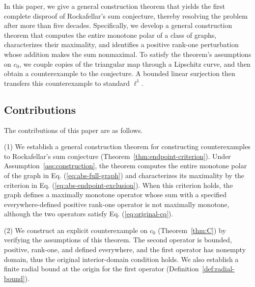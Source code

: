 \documentclass[11pt]{article}
\theoremstyle{definition}
\theoremstyle{remark}
\begin{document}

In this paper, we give a general construction theorem that yields the first complete disproof of Rockafellar's sum conjecture, thereby resolving the problem after more than five decades. 
Specifically, we develop a general construction theorem that computes the entire monotone polar of a class of graphs, characterizes their maximality, and identifies a positive rank-one perturbation whose addition makes the sum nonmaximal. To satisfy the theorem's assumptions on $c_0$, we couple copies of the triangular map through a Lipschitz curve, and then obtain a counterexample to the conjecture. A bounded linear surjection then transfers this counterexample to standard $\ell^1$. 

\subsection{Contributions}
The contributions of this paper are as follows. 

(1) We establish a general construction theorem for constructing counterexamples to Rockafellar's sum conjecture (Theorem~\ref{thm:endpoint-criterion}). Under Assumption~\ref{ass:construction}, the theorem computes the entire monotone polar of the graph in Eq. (\ref{eq:abs-full-graph}) and characterizes its maximality by the criterion in Eq. (\ref{eq:abs-endpoint-exclusion}). When this criterion holds, the graph defines a maximally monotone operator whose sum with a specified everywhere-defined positive rank-one operator is not maximally monotone, although the two operators satisfy Eq. (\ref{eq:original-cq}).

(2) We construct an explicit counterexample on $c_0$ (Theorem~\ref{thm:C}) by verifying the assumptions of this theorem. The second operator is bounded, positive, rank-one, and defined everywhere, and the first operator has nonempty domain, thus the original interior-domain condition holds. We also establish a finite radial bound at the origin for the first operator (Definition~\ref{def:radial-bound}).
\end{document}
